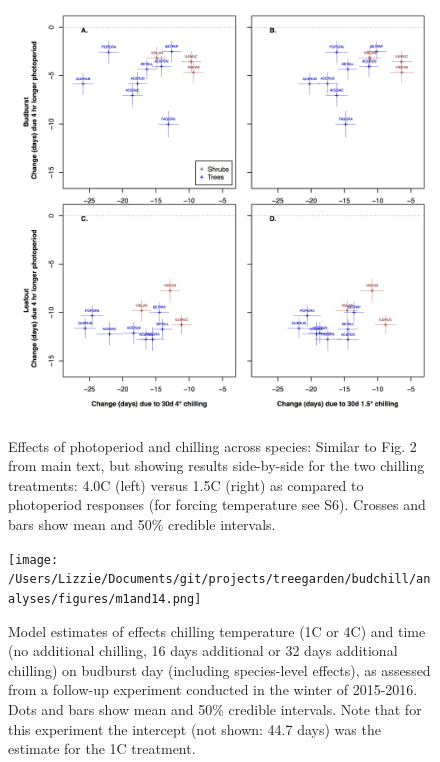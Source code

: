 \documentclass{article}
\begin{document}
\begin{figure}
\label{fig:figS7}
\includegraphics[width=1\textwidth]{FigChillPhoto_4panel.png}
\caption{Effects of photoperiod and chilling across species: Similar to Fig. 2 from main text, but showing results side-by-side for the two chilling treatments: 4.0\degree C (left) versus 1.5\degree C (right) as compared to photoperiod responses (for forcing temperature see S6). Crosses and bars show mean and 50\% credible intervals.}
\end{figure}

\begin{figure}
\texttt{[image: /Users/Lizzie/Documents/git/projects/treegarden/budchill/analyses/figures/m1and14.png]} %
\caption{Model estimates of effects chilling temperature (1\degree C or 4\degree C) and time (no additional chilling, 16 days additional or 32 days additional chilling) on budburst day (including species-level effects), as assessed from a follow-up experiment conducted in the winter of 2015-2016. Dots and bars show mean and 50\% credible intervals. Note that for this experiment the intercept (not shown: 44.7 days) was the estimate for the 1\degree C treatment.}
\label{fig:figbudchill}
\end{figure}
\end{document}
